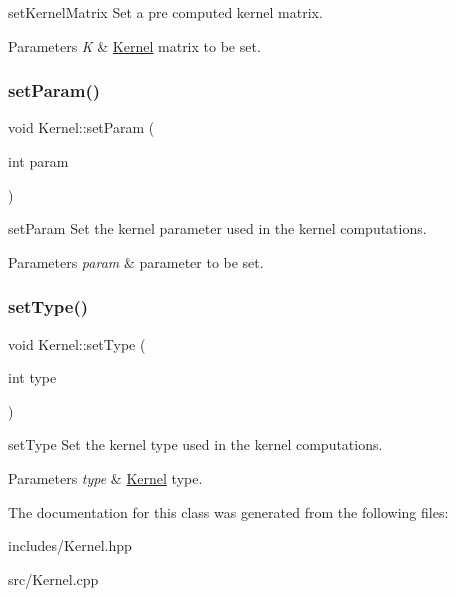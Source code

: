 set\+Kernel\+Matrix Set a pre computed kernel matrix. 


\begin{DoxyParams}{Parameters}
{\em K} & \mbox{\hyperlink{class_kernel}{Kernel}} matrix to be set. \\
\hline
\end{DoxyParams}
\mbox{\label{class_kernel_a4fe711ebdbc168be1733fbb8aea6cf92}} 
\subsubsection{\texorpdfstring{set\+Param()}{setParam()}}
{\footnotesize\ttfamily void Kernel\+::set\+Param (\begin{DoxyParamCaption}\item[{int}]{param }\end{DoxyParamCaption})}



set\+Param Set the kernel parameter used in the kernel computations. 


\begin{DoxyParams}{Parameters}
{\em param} & parameter to be set. \\
\hline
\end{DoxyParams}
\mbox{\label{class_kernel_ad01e209470accf44ea240078f39fb127}} 
\subsubsection{\texorpdfstring{set\+Type()}{setType()}}
{\footnotesize\ttfamily void Kernel\+::set\+Type (\begin{DoxyParamCaption}\item[{int}]{type }\end{DoxyParamCaption})}



set\+Type Set the kernel type used in the kernel computations. 


\begin{DoxyParams}{Parameters}
{\em type} & \mbox{\hyperlink{class_kernel}{Kernel}} type. \\
\hline
\end{DoxyParams}


The documentation for this class was generated from the following files\+:\begin{DoxyCompactItemize}
\item 
includes/Kernel.\+hpp\item 
src/Kernel.\+cpp\end{DoxyCompactItemize}
